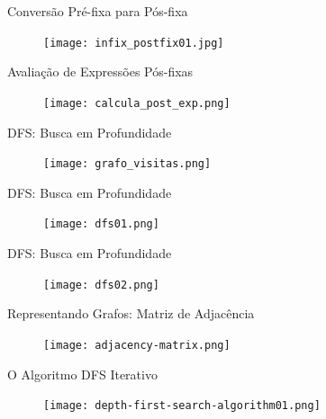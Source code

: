 \begin{frame}[c]{Conversão Pré-fixa para Pós-fixa} 

		   	\begin{figure}[!htpb]
				\centering
				\texttt{[image: infix\_postfix01.jpg]}
			\end{figure} 
\end{frame}



\begin{frame}[c]{Avaliação de Expressões Pós-fixas} 

		   	\begin{figure}[!htpb]
				\centering
				\texttt{[image: calcula\_post\_exp.png]}
			\end{figure} 
\end{frame}


\begin{frame}[c]{DFS: Busca em Profundidade} 

		   	\begin{figure}[!htpb]
				\centering
				\texttt{[image: grafo\_visitas.png]}
			\end{figure} 
\end{frame}



\begin{frame}[c]{DFS: Busca em Profundidade} 

		   	\begin{figure}[!htpb]
				\centering
				\texttt{[image: dfs01.png]}
			\end{figure} 
\end{frame}



\begin{frame}[c]{DFS: Busca em Profundidade} 

		   	\begin{figure}[!htpb]
				\centering
				\texttt{[image: dfs02.png]}
			\end{figure} 
\end{frame}


\begin{frame}[c]{Representando Grafos: Matriz de Adjacência} 

		   	\begin{figure}[!htpb]
				\centering
				\texttt{[image: adjacency-matrix.png]}
			\end{figure} 
\end{frame}


\begin{frame}[c]{O Algoritmo DFS Iterativo} 

		   	\begin{figure}[!htpb]
				\centering
				\texttt{[image: depth-first-search-algorithm01.png]}
			\end{figure} 
\end{frame}


